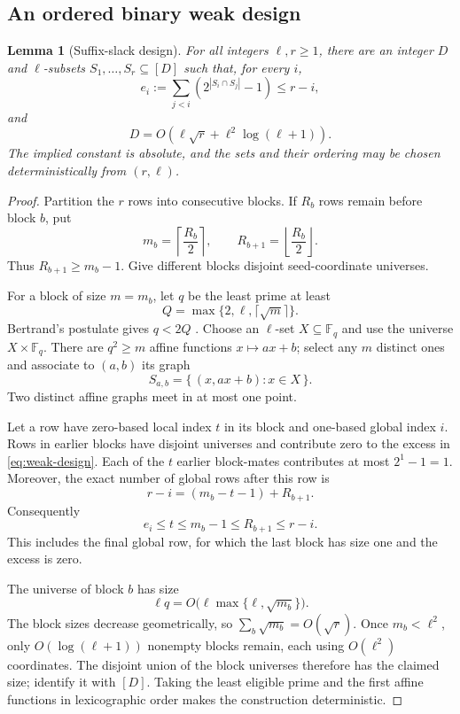 \documentclass[11pt]{article}
\numberwithin{equation}{section}
\newtheorem{lemma}[theorem]{Lemma}
\theoremstyle{definition}
\theoremstyle{remark}
\newcommand{\F}{\mathbb F}
\begin{document}
\subsection{An ordered binary weak design}

\begin{lemma}[Suffix-slack design]\label{lem:design}
For all integers $\ell,r\ge1$, there are an integer $D$ and
$\ell$-subsets $S_1,\ldots,S_r\subseteq[D]$ such that, for every $i$,
\begin{equation}\label{eq:weak-design}
 e_i:=\sum_{j<i}\left(2^{|S_i\cap S_j|}-1\right)\le r-i,
\end{equation}
and
\[
 D=O\left(\ell\sqrt r+\ell^2\log(\ell+1)\right).
\]
The implied constant is absolute, and the sets and their ordering may be
chosen deterministically from $(r,\ell)$.
\end{lemma}

\begin{proof}
Partition the $r$ rows into consecutive blocks.  If $R_b$ rows remain
before block $b$, put
\[
 m_b=\left\lceil\frac{R_b}{2}\right\rceil,
 \qquad
 R_{b+1}=\left\lfloor\frac{R_b}{2}\right\rfloor.
\]
Thus $R_{b+1}\ge m_b-1$.  Give different blocks disjoint seed-coordinate
universes.

For a block of size $m=m_b$, let $q$ be the least prime at least
\[
 Q=\max\{2,\ell,\lceil\sqrt m\rceil\}.
\]
Bertrand's postulate gives $q<2Q$ \cite{HardyWright2008}.  Choose an
$\ell$-set $X\subseteq\F_q$ and use the universe $X\times\F_q$.
There are $q^2\ge m$ affine functions $x\mapsto ax+b$; select any $m$
distinct ones and associate to $(a,b)$ its graph
\[
 S_{a,b}=\{\,(x,ax+b):x\in X\,\}.
\]
Two distinct affine graphs meet in at most one point.

Let a row have zero-based local index $t$ in its block and one-based global
index $i$.  Rows in earlier blocks have disjoint universes and contribute
zero to the excess in \eqref{eq:weak-design}.  Each of the $t$ earlier
block-mates contributes at most $2^1-1=1$.  Moreover, the exact number of
global rows after this row is
\[
 r-i=(m_b-t-1)+R_{b+1}.
\]
Consequently
\[
 e_i\le t\le m_b-1\le R_{b+1}\le r-i.
\]
This includes the final global row, for which the last block has size one
and the excess is zero.

The universe of block $b$ has size
\[
 \ell q=O\bigl(\ell\max\{\ell,\sqrt{m_b}\}\bigr).
\]
The block sizes decrease geometrically, so
$\sum_b\sqrt{m_b}=O(\sqrt r)$.  Once $m_b<\ell^2$, only
$O(\log(\ell+1))$ nonempty blocks remain, each using $O(\ell^2)$
coordinates.  The disjoint union of the block universes therefore has the
claimed size; identify it with $[D]$.  Taking the least eligible prime and
the first affine functions in lexicographic order makes the construction
deterministic.
\end{proof}
\end{document}
